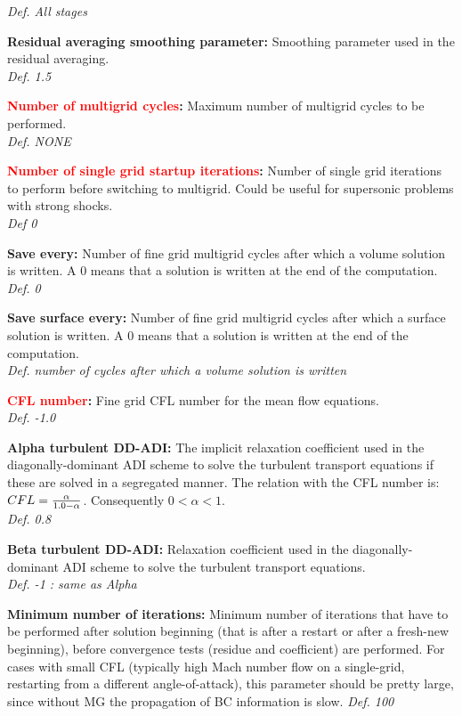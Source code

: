 \documentclass[12pt,epsf,colordvi]{article}
\begin{document}
\begin{description}
{\it Def. All stages}
%
    \item{\bf Residual averaging smoothing parameter:} Smoothing parameter used in the residual averaging.\\
{\it Def.   1.5}
%
    \item{\bf \textcolor{red}{Number of multigrid cycles}:} Maximum number of multigrid cycles to be performed. \\
{\it Def. NONE }
%
    \item{\bf \textcolor{red}{Number of single grid startup iterations}:} Number of single grid iterations to perform before switching to multigrid. Could be useful for supersonic problems with strong shocks. \\
{\it Def 0 }
%
     \item{\bf Save every:} Number of fine grid multigrid cycles after which a volume solution is written. A 0 means that a solution is written at the end of the computation. \\
{\it Def. 0 }
%
     \item{\bf Save surface every:}  Number of fine grid multigrid cycles after which a surface solution is written. A 0 means that a solution is written at the end of the computation. \\
{\it Def.  number of cycles after which a volume solution is written}
%
    \item{\bf \textcolor{red}{CFL number}:} Fine grid CFL number for the mean flow equations. \\
{\it Def. -1.0 }
%
    \item{\bf Alpha turbulent DD-ADI: } The implicit relaxation coefficient used in the diagonally-dominant ADI scheme to solve the turbulent transport equations if these are solved in a segregated manner. The relation with the CFL number is: \(CFL = {\alpha \over {1.0 - \alpha}} \). Consequently \(0 < \alpha < 1\).  \\
{\it Def.  0.8}
%
    \item{\bf Beta turbulent DD-ADI: } Relaxation coefficient used in the diagonally-dominant ADI scheme to solve the turbulent transport equations. \\
{\it Def.   -1 : same as Alpha }
%
    \item{\bf Minimum number of iterations:} Minimum number of iterations that have to be performed after solution beginning (that is after a restart or after a fresh-new beginning), before convergence tests (residue and coefficient) are performed. For cases with small CFL (typically high Mach number flow on a single-grid, restarting from a different angle-of-attack),  this parameter should be pretty large, since without MG the propagation of BC information is slow. {\it Def. 100 }

\end{description}
\end{document}
